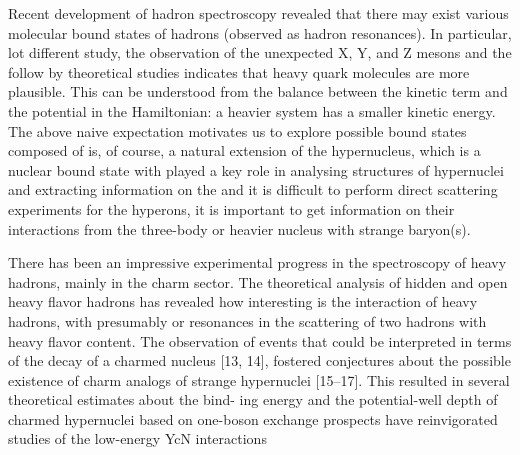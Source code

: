\documentclass[12pt,a4paper]{book}
\begin{document}
	Recent development of hadron spectroscopy revealed that there may exist various molecular bound states of hadrons (observed as hadron resonances). In particular, lot different study,  the observation	of the unexpected X, Y, and Z mesons and the follow by theoretical studies indicates that heavy quark molecules are more plausible. This can be understood from the balance between the kinetic term and the potential in the Hamiltonian: a heavier system has a smaller kinetic
	energy. The above naive expectation motivates us to explore possible bound states composed of
	is, of course, a natural extension of the hypernucleus, which is a nuclear bound state with
	played a key role in analysing structures of hypernuclei and extracting information on the
	and it is difficult to perform direct scattering experiments for the hyperons, it is important
	to get information on their interactions from the three-body or heavier nucleus with strange
	baryon(s).
	
	There has been an impressive experimental progress in the spectroscopy of heavy hadrons,
	mainly in the charm sector. The theoretical analysis of hidden and open heavy flavor
	hadrons has revealed how interesting is the interaction of heavy hadrons, with presumably
	or resonances in the scattering of two hadrons with heavy flavor content.  The observation of events that could be interpreted in terms of the decay of a
	charmed nucleus [13, 14], fostered conjectures about the possible existence of charm analogs
	of strange hypernuclei [15–17]. This resulted in several theoretical estimates about the bind-
	ing energy and the potential-well depth of charmed hypernuclei based on one-boson exchange
	prospects have reinvigorated studies of the low-energy YcN interactions
	
	
\end{document}
